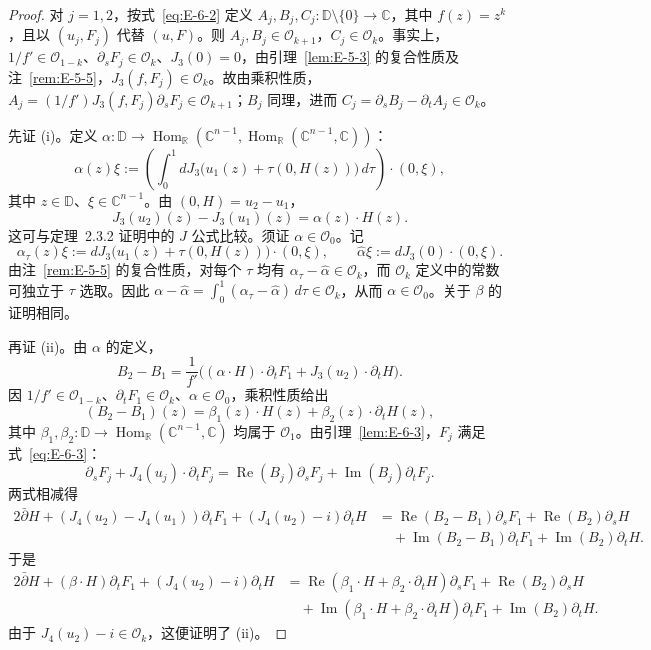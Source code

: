 \begin{proof}
对 $j=1,2$，按式~\eqref{eq:E-6-2} 定义 $A_j,B_j,C_j:\mathbb D\setminus\{0\}\to\mathbb C$，其中 $f(z)=z^k$，且以 $(u_j,F_j)$ 代替 $(u,F)$。则 $A_j,B_j\in\mathcal O_{k+1}$，$C_j\in\mathcal O_k$。事实上，$1/f'\in\mathcal O_{1-k}$、$\partial_sF_j\in\mathcal O_k$、$J_3(0)=0$，由引理~\ref{lem:E-5-3} 的复合性质及注~\ref{rem:E-5-5}，$J_3(f,F_j)\in\mathcal O_k$。故由乘积性质，$A_j=(1/f')J_3(f,F_j)\partial_sF_j\in\mathcal O_{k+1}$；$B_j$ 同理，进而 $C_j=\partial_sB_j-\partial_tA_j\in\mathcal O_k$。

先证 (i)。定义 $\alpha:\mathbb D\to\operatorname{Hom}_{\mathbb R}(\mathbb C^{n-1},\operatorname{Hom}_{\mathbb R}(\mathbb C^{n-1},\mathbb C))$：
\[
  \alpha(z)\xi:=\left(\int_0^1
       dJ_3\bigl(u_1(z)+\tau(0,H(z))\bigr)\,d\tau\right)
       \cdot(0,\xi),
\]
其中 $z\in\mathbb D$、$\xi\in\mathbb C^{n-1}$。由 $(0,H)=u_2-u_1$，
\[
  J_3(u_2)(z)-J_3(u_1)(z)=\alpha(z)\cdot H(z).
\]
这可与定理~2.3.2 证明中的 $J$ 公式比较。须证 $\alpha\in\mathcal O_0$。记
\[
  \alpha_\tau(z)\xi:=dJ_3\bigl(u_1(z)+\tau(0,H(z))\bigr)
      \cdot(0,\xi),\qquad
  \widehat\alpha\xi:=dJ_3(0)\cdot(0,\xi).
\]
由注~\ref{rem:E-5-5} 的复合性质，对每个 $\tau$ 均有 $\alpha_\tau-\widehat\alpha\in\mathcal O_k$，而 $\mathcal O_k$ 定义中的常数可独立于 $\tau$ 选取。因此 $\alpha-\widehat\alpha=\int_0^1(\alpha_\tau-\widehat\alpha)\,d\tau\in\mathcal O_k$，从而 $\alpha\in\mathcal O_0$。关于 $\beta$ 的证明相同。

再证 (ii)。由 $\alpha$ 的定义，
\[
  B_2-B_1=\frac1{f'}\bigl((\alpha\cdot H)\cdot\partial_tF_1
                       +J_3(u_2)\cdot\partial_tH\bigr).
\]
因 $1/f'\in\mathcal O_{1-k}$、$\partial_tF_1\in\mathcal O_k$、$\alpha\in\mathcal O_0$，乘积性质给出
\[
  (B_2-B_1)(z)=\beta_1(z)\cdot H(z)
                     +\beta_2(z)\cdot\partial_tH(z),
\]
其中 $\beta_1,\beta_2:\mathbb D\to\operatorname{Hom}_{\mathbb R}(\mathbb C^{n-1},\mathbb C)$ 均属于 $\mathcal O_1$。由引理~\ref{lem:E-6-3}，$F_j$ 满足式~\eqref{eq:E-6-3}：
\[
  \partial_sF_j+J_4(u_j)\cdot\partial_tF_j
   =\operatorname{Re}(B_j)\partial_sF_j
     +\operatorname{Im}(B_j)\partial_tF_j.
\]
两式相减得
\begin{align*}
  2\bar\partial H+(J_4(u_2)-J_4(u_1))\partial_tF_1
   +(J_4(u_2)-i)\partial_tH
   &=\operatorname{Re}(B_2-B_1)\partial_sF_1
     +\operatorname{Re}(B_2)\partial_sH\\
   &\quad+\operatorname{Im}(B_2-B_1)\partial_tF_1
     +\operatorname{Im}(B_2)\partial_tH.
\end{align*}
于是
\begin{align*}
  2\bar\partial H+(\beta\cdot H)\partial_tF_1
     +(J_4(u_2)-i)\partial_tH
  &=\operatorname{Re}(\beta_1\cdot H+\beta_2\cdot\partial_tH)
       \partial_sF_1
       +\operatorname{Re}(B_2)\partial_sH\\
  &\quad+\operatorname{Im}(\beta_1\cdot H+\beta_2\cdot\partial_tH)
       \partial_tF_1+\operatorname{Im}(B_2)\partial_tH.
\end{align*}
由于 $J_4(u_2)-i\in\mathcal O_k$，这便证明了 (ii)。


\end{proof}
